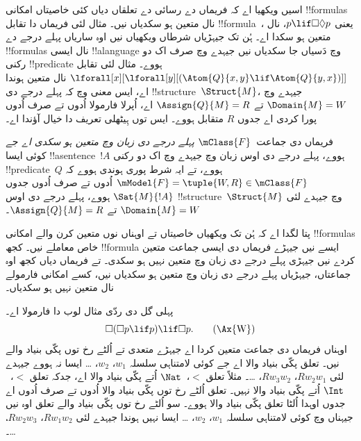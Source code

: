 \documentclass[../../../include/open-logic-section]{subfiles}
\begin{document}


اسیں ویکھیا اے کہ فریماں دے رسائی دے تعلقاں دیاں کئی خاصیتاں امکانی !!{formula}s نال متعین ہو سکدیاں نیں۔ مثال لئی فریماں دا تقابل !!{formula}~، یعنی $p \lif \Box\Diamond
p$، نال متعین ہو سکدا اے۔ ہُن تک جیہڑیاں شرطاں ویکھیاں نیں اوہ ساریاں پہلے درجے دے !!{formula}s نال ایسی !!a{language} وچ دَسیاں جا سکدیاں نیں جیہدے وچ صرف اک دو رکنی !!{predicate} ہووے۔ مثال لئی تقابل
$\lforall[x][\lforall[y][(\Atom{Q}{x,y} \lif \Atom{Q}{y, x})]]$ نال متعین ہوندا اے، ایس معنی وچ کہ پہلے درجے دی !!{structure}~$\Struct{M}$، جیہدے وچ $\Domain{M} =
W$ تے $\Assign{Q}{M} = R$ اے، اُپرلا فارمولا اُدوں تے صرف اُدوں پورا کردی اے جدوں $R$ متقابل ہووے۔ ایس توں ہِیٹھلی تعریف دا خیال آؤندا اے۔

\begin{defn}
  فریماں دی جماعت~$\mClass{F}$ \emph{پہلے درجے دی زبان وچ متعین ہو سکدی اے} جے کوئی ایسا !!a{sentence}~$!A$ ہووے، پہلے درجے دی اوس زبان وچ جیہدے وچ اک دو رکنی !!{predicate}~$Q$ ہووے، تے ایہ شرط پوری ہوندی ہووے کہ $\mModel{F} =
  \tuple{W, R} \in \mClass{F}$ اُدوں تے صرف اُدوں جدوں $\Sat{M}{!A}$ ہووے، پہلے درجے دی اوس !!{structure}~$\Struct{M}$ وچ جیہدے لئی $\Domain{M} = W$ تے $\Assign{Q}{M}
  = R$۔
\end{defn}

پتا لگدا اے کہ ہُن تک ویکھیاں خاصیتاں تے اوہناں نوں متعین کرن والے امکانی !!{formula}s خاص معاملے نیں۔ کجھ !!{formula} ایسے نیں جیہڑے فریماں دی ایسی جماعت متعین کردے نیں جیہڑی پہلے درجے دی زبان وچ متعین نہیں ہو سکدی۔ تے فریماں دیاں کجھ اوہ جماعتاں، جیہڑیاں پہلے درجے دی زبان وچ متعین ہو سکدیاں نیں، کسے امکانی فارمولے نال متعین نہیں ہو سکدیاں۔

پہلی گل دی ردّی مثال لوب دا فارمولا اے۔
\begin{equation}
\Box(\Box p \lif p) \lif \Box p. \tag{\Ax{W}}
\end{equation}
 اوہناں فریماں دی جماعت متعین کردا اے جیہڑے متعدی تے اُلٹے رخ توں پکّی بنیاد والے نیں۔ تعلق پکّی بنیاد والا اے جے کوئی لامتناہی سلسلہ $w_1$، $w_2$، \dots{} ایسا نہ ہووے جیہدے لئی $Rw_2w_1$، $Rw_3w_2$، \dots۔ مثلاً تعلق $<$،~$\Nat$ اُتے پکّی بنیاد والا اے، جدکہ تعلق $<$،~$\Int$ اُتے پکّی بنیاد والا نہیں۔ تعلق اُلٹے رخ توں پکّی بنیاد والا اُدوں تے صرف اُدوں اے جدوں اوہدا اُلٹا تعلق پکّی بنیاد والا ہووے۔ سو اُلٹے رخ توں پکّی بنیاد والے تعلق اوہ نیں جیہناں وچ کوئی لامتناہی سلسلہ $w_1$، $w_2$، \dots{} ایسا نہیں ہوندا جیہدے لئی $Rw_1w_2$، $Rw_2w_3$، \dots۔
\end{document}
